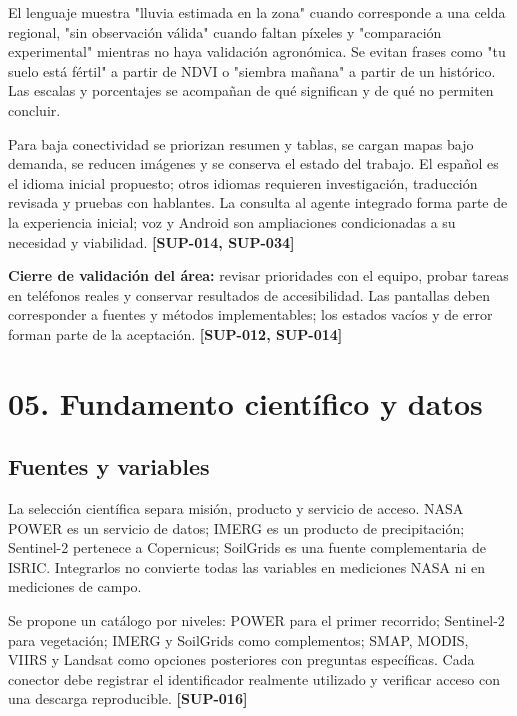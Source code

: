 \documentclass[10pt,a4paper]{article}
\begin{document}
El lenguaje muestra "lluvia estimada en la zona" cuando corresponde a una celda regional, "sin observación válida" cuando faltan píxeles y "comparación experimental" mientras no haya validación agronómica. Se evitan frases como "tu suelo está fértil" a partir de NDVI o "siembra mañana" a partir de un histórico. Las escalas y porcentajes se acompañan de qué significan y de qué no permiten concluir.


Para baja conectividad se priorizan resumen y tablas, se cargan mapas bajo demanda, se reducen imágenes y se conserva el estado del trabajo. El español es el idioma inicial propuesto; otros idiomas requieren investigación, traducción revisada y pruebas con hablantes. La consulta al agente integrado forma parte de la experiencia inicial; voz y Android son ampliaciones condicionadas a su necesidad y viabilidad. \textbf{[SUP-014, SUP-034]}


\textbf{Cierre de validación del área:} revisar prioridades con el equipo, probar tareas en teléfonos reales y conservar resultados de accesibilidad. Las pantallas deben corresponder a fuentes y métodos implementables; los estados vacíos y de error forman parte de la aceptación. \textbf{[SUP-012, SUP-014]}


\clearpage\section{05. Fundamento científico y datos}\label{05-fundamento-científico-y-datos}

\subsection{Fuentes y variables}

La selección científica separa misión, producto y servicio de acceso. NASA POWER es un servicio de datos; IMERG es un producto de precipitación; Sentinel-2 pertenece a Copernicus; SoilGrids es una fuente complementaria de ISRIC. Integrarlos no convierte todas las variables en mediciones NASA ni en mediciones de campo.


Se propone un catálogo por niveles: POWER para el primer recorrido; Sentinel-2 para vegetación; IMERG y SoilGrids como complementos; SMAP, MODIS, VIIRS y Landsat como opciones posteriores con preguntas específicas. Cada conector debe registrar el identificador realmente utilizado y verificar acceso con una descarga reproducible. \textbf{[SUP-016]}
\end{document}
